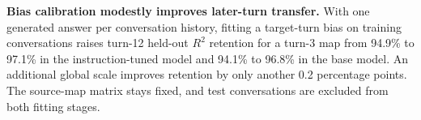 \noindent\textbf{Bias calibration modestly improves later-turn transfer.} With one generated answer per conversation history, fitting a target-turn bias on training conversations raises turn-12 held-out $R^2$ retention for a turn-3 map from 94.9\% to 97.1\% in the instruction-tuned model and 94.1\% to 96.8\% in the base model. An additional global scale improves retention by only another 0.2 percentage points. The source-map matrix stays fixed, and test conversations are excluded from both fitting stages.
